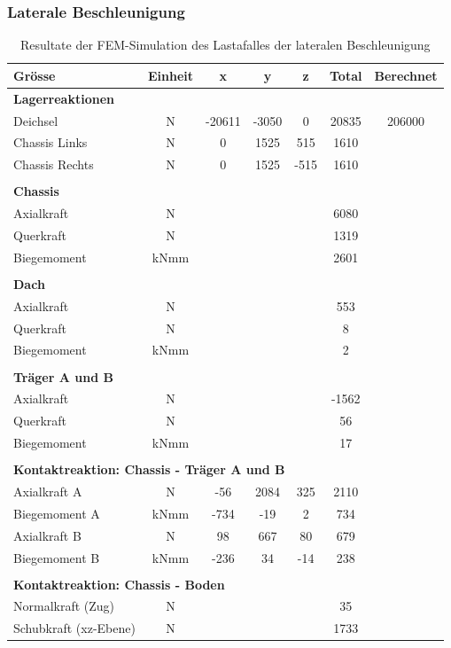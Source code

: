 \subsubsection{Laterale Beschleunigung}
\begin{table}[H]
\centering
\begin{tabular}{lcccccc}
Grösse	&	Einheit	&	x	&	y	&	z	&	Total	&	Berechnet	\\	\hline
\multicolumn{5}{l}{\textbf{Lagerreaktionen}}									&		&		\\	\thickhline
Deichsel	&	N	&	-20611	&	-3050	&	0	&	20835	&	206000	\\
Chassis Links	&	N	&	0	&	1525	&	515	&	1610	&		\\
Chassis Rechts	&	N	&	0	&	1525	&	-515	&	1610	&		\\	\hline	\\
\multicolumn{5}{l}{\textbf{Chassis}}									&		&		\\	\thickhline
Axialkraft	&	N	&		&		&		&	6080	&		\\
Querkraft	&	N	&		&		&		&	1319	&	 \\
Biegemoment	&	kNmm	&		&		&		&	2601	&		\\	\hline	\\
\multicolumn{5}{l}{\textbf{Dach}}									&		&		\\	\thickhline
Axialkraft	&	N	&		&		&		&	553	&		\\
Querkraft	&	N	&		&		&		&	8	&		\\
Biegemoment	&	kNmm	&		&		&		&	2	&		\\	\hline	\\
\multicolumn{5}{l}{\textbf{Träger A und B}}													\\	\thickhline
Axialkraft	&	N	&		&		&		&	-1562	&		\\
Querkraft	&	N	&		&		&		&	56	&		\\
Biegemoment	&	kNmm	&		&		&		&	17	&		\\	\hline	\\
\multicolumn{5}{l}{\textbf{Kontaktreaktion: Chassis - Träger A und B}}									&		&		\\	\thickhline
 Axialkraft A	&	N	&	-56	&	2084	&	325	&	2110	&		\\
Biegemoment A	&	kNmm	&	-734	&	-19	&	2	&	734	&		\\
Axialkraft B	&	N	&	98	&	667	&	80	&	679	&		\\
Biegemoment B	&	kNmm	&	-236	&	34	&	-14	&	238	&		\\	\hline	\\
\multicolumn{5}{l}{\textbf{Kontaktreaktion: Chassis - Boden}}									&		&		\\	\thickhline
Normalkraft (Zug)	&	N	&		&		&		&	35	&		\\
Schubkraft (xz-Ebene)	&	N	&		&		&		&	1733	&		\\	\hline
\end{tabular}
\caption{Resultate der FEM-Simulation des Lastafalles der lateralen Beschleunigung}
\label{tab:FEM 1.2}
\end{table}



